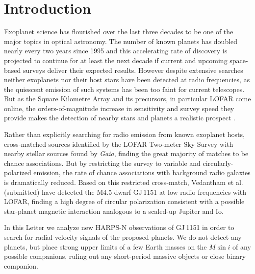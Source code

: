 \documentclass[modern]{aastex62}
\newcommand{\gaia}{\textit{Gaia}\xspace}
\begin{document}


\section{Introduction} 
\label{sec:intro}

Exoplanet science has flourished over the last three decades to be one of the major topics in optical astronomy. The number of known planets has doubled nearly every two years since 1995 \citep{Mamajek2016} and this accelerating rate of discovery is projected to continue for at least the next decade if current and upcoming space-based surveys deliver their expected results. However despite extensive searches \citep{2000ApJ...545.1058B,2013A&A...552A..65L,2018MNRAS.tmp.1077L} neither exoplanets nor their host stars have been detected at radio frequencies, as the quiescent emission of such systems has been too faint for current telescopes. But as the Square Kilometre Array \citep[SKA;][]{2009IEEEP..97.1482D} and its precursors, in particular LOFAR \citep[the LOw-Frequency ARray:][]{lofar} come online, the orders-of-magnitude increase in sensitivity and survey speed they provide makes the detection of nearby stars and planets a realistic prospect \citep{pope19}. 

Rather than explicitly searching for radio emission from known exoplanet hosts, \citet{Callingham_2019} cross-matched sources identified by the LOFAR Two-meter Sky Survey \citep[LoTSS:][]{lotss} with nearby stellar sources found by \gaia, finding the great majority of matches to be chance associations. But by restricting the survey to variable and circularly-polarized emission, the rate of chance associations with background radio galaxies is dramatically reduced. Based on this restricted cross-match, Vedantham et al. (submitted) have detected the M4.5 dwarf GJ\,1151 at low radio frequencies with LOFAR, finding a high degree of circular polarization consistent with a possible star-planet magnetic interaction analogous to a scaled-up Jupiter and Io. 

In this Letter we analyze new HARPS-N \citep[High Accuracy Radial velocity Planet Searcher:][]{harpsn} observations of GJ\,1151 in order to search for radial velocity signals of the proposed planets. We do not detect any planets, but place strong upper limits of a few Earth masses on the $M\sin{i}$ of any possible companions, ruling out any short-period massive objects or close binary companion.  
\end{document}
